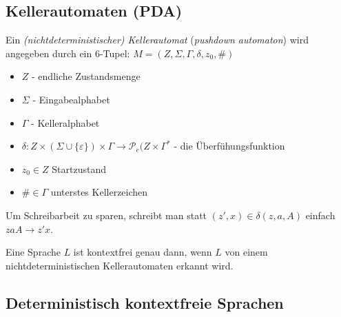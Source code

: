 \documentclass{scrartcl}
\begin{document}
\subsection*{Kellerautomaten (PDA)}
\begin{shaded}
    Ein \emph{(nichtdeterministischer) Kellerautomat} (\emph{pushdown automaton}) wird angegeben durch ein 6-Tupel: $M=\left(Z,\Sigma,\Gamma,\delta,z_0,\#\right) $ \\
    \begin{minipage}[t]{0.48\textwidth}
        \begin{itemize}
            \item $Z$ - endliche Zustandsmenge
            \item $\Sigma$ - Eingabealphabet
            \item $\Gamma$ - Kelleralphabet
        \end{itemize}
    \end{minipage}
    \hfill \vrule \hfill
    \begin{minipage}[t]{0.48\textwidth}
        \begin{itemize}
            \item $ \delta:Z\times(\Sigma\cup\{\varepsilon\})\times\Gamma\to\mathcal{P}_e (Z\times\Gamma^* $ - die Überfühungsfunktion
            \item $z_0\in Z$ Startzustand
            \item $\#\in\Gamma$ unterstes Kellerzeichen
        \end{itemize}
    \end{minipage}
\end{shaded}

Um Schreibarbeit zu sparen, schreibt man statt $(z',x)\in\delta(z,a,A)$ einfach $zaA\to z'x$.

\begin{shaded}
    Eine Sprache $L$ ist kontextfrei genau dann, wenn $L$ von einem nichtdeterministischen Kellerautomaten erkannt wird.
\end{shaded}

\subsection*{Deterministisch kontextfreie Sprachen}
\end{document}
